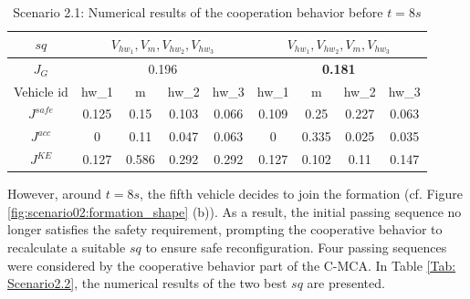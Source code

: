 \begin{table}[!h]
\setlength\tabcolsep{6.0pt} %

\caption{Scenario 2.1: Numerical results of the cooperation behavior before $t=8s$}
\label{Tab:scenario2.1}
\begin{tabular}{|c|cccc|cccc|}
\hline
$sq$       & \multicolumn{4}{c|}{$V_{hw_{1}},V_{m},V_{hw_{2}},V_{hw_{3}}$}                                                       & \multicolumn{4}{c|}{$V_{hw_{1}},V_{hw_{2}},V_{m},V_{hw_{3}}$}                                                       \\ \hline
$J_G$      & \multicolumn{4}{c|}{0.196}                                                                   & \multicolumn{4}{c|}{{\textbf{0.181}}}                                                 \\ \hline
Vehicle id    & \multicolumn{1}{c|}{hw_{1}}     & \multicolumn{1}{c|}{m}     & \multicolumn{1}{c|}{hw_{2}}     & hw_{3}     & \multicolumn{1}{c|}{hw_{1}}     & \multicolumn{1}{c|}{m}     & \multicolumn{1}{c|}{hw_{2}}     & hw_{3}         \\ \hline
$J^{safe}$ & \multicolumn{1}{c|}{0.125} & \multicolumn{1}{c|}{0.15}  & \multicolumn{1}{c|}{0.103} & 0.066 & \multicolumn{1}{c|}{0.109} & \multicolumn{1}{c|}{0.25}  & \multicolumn{1}{c|}{0.227} & 0.063 \\ \hline
$J^{acc}$  & \multicolumn{1}{c|}{0}     & \multicolumn{1}{c|}{0.11}  & \multicolumn{1}{c|}{0.047} & 0.063 & \multicolumn{1}{c|}{0}     & \multicolumn{1}{c|}{0.335} & \multicolumn{1}{c|}{0.025} & 0.035 \\ \hline
$J^{KE}$  & \multicolumn{1}{c|}{0.127} & \multicolumn{1}{c|}{0.586} & \multicolumn{1}{c|}{0.292} & 0.292 & \multicolumn{1}{c|}{0.127} & \multicolumn{1}{c|}{0.102} & \multicolumn{1}{c|}{0.11}  & 0.147 \\ \hline
\end{tabular}
\end{table}



\newpage



However, around $t=8s$, the fifth vehicle decides to join the formation (cf. Figure \ref{fig:scenario02:formation_shape} (b)). As a result, the initial passing sequence no longer satisfies the safety requirement, prompting the cooperative behavior to recalculate a suitable $sq$ to ensure safe reconfiguration. Four passing sequences were considered by the cooperative behavior part of the C-MCA. In Table \ref{Tab: Scenario2.2}, the numerical results of the two best $sq$ are presented. 


